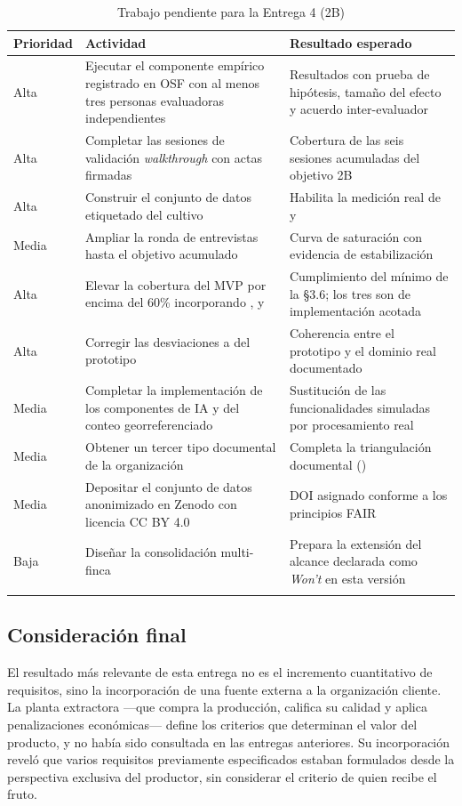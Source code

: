 \begin{longtable}{|C{1.4cm}|L{7.0cm}|L{6.6cm}|}
\hline
{}\textbf{Prioridad} & \textbf{Actividad} & \textbf{Resultado esperado} \\
\hline
\endhead
Alta & Ejecutar el componente empírico registrado en OSF con al menos tres personas evaluadoras independientes & Resultados con prueba de hipótesis, tamaño del efecto y acuerdo inter-evaluador \\ \hline
Alta & Completar las sesiones de validación \emph{walkthrough} con actas firmadas & Cobertura de las seis sesiones acumuladas del objetivo 2B \\ \hline
Alta & Construir el conjunto de datos etiquetado del cultivo & Habilita la medición real de  y  \\ \hline
Media & Ampliar la ronda de entrevistas hasta el objetivo acumulado & Curva de saturación con evidencia de estabilización \\ \hline
Alta & Elevar la cobertura del MVP por encima del 60\% incorporando ,  y  & Cumplimiento del mínimo de la §3.6; los tres son de implementación acotada \\ \hline
Alta & Corregir las desviaciones  a  del prototipo & Coherencia entre el prototipo y el dominio real documentado \\ \hline
Media & Completar la implementación de los componentes de IA y del conteo georreferenciado & Sustitución de las funcionalidades simuladas por procesamiento real \\ \hline
Media & Obtener un tercer tipo documental de la organización & Completa la triangulación documental () \\ \hline
Media & Depositar el conjunto de datos anonimizado en Zenodo con licencia CC BY 4.0 & DOI asignado conforme a los principios FAIR \cite{wilkinson2016} \\ \hline
Baja & Diseñar la consolidación multi-finca & Prepara la extensión del alcance declarada como \emph{Won't} en esta versión \\ \hline
\caption{Trabajo pendiente para la Entrega 4 (2B)}
\end{longtable}

\subsection{Consideración final}

El resultado más relevante de esta entrega no es el incremento cuantitativo de requisitos, sino la
incorporación de una fuente externa a la organización cliente. La planta extractora ---que compra la
producción, califica su calidad y aplica penalizaciones económicas--- define los criterios que
determinan el valor del producto, y no había sido consultada en las entregas anteriores. Su
incorporación reveló que varios requisitos previamente especificados estaban formulados desde la
perspectiva exclusiva del productor, sin considerar el criterio de quien recibe el fruto.

